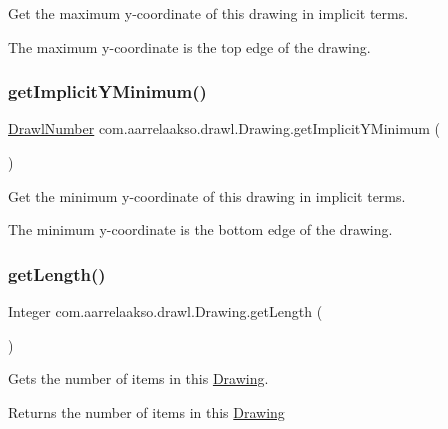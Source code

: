 Get the maximum y-\/coordinate of this drawing in implicit terms. 

The maximum y-\/coordinate is the top edge of the drawing. \mbox{\label{classcom_1_1aarrelaakso_1_1drawl_1_1_drawing_a0dcb410e8fb2769222b62d04da80eadd}} 
\subsubsection{\texorpdfstring{get\+Implicit\+Y\+Minimum()}{getImplicitYMinimum()}}
{\footnotesize\ttfamily \hyperlink{classcom_1_1aarrelaakso_1_1drawl_1_1_drawl_number}{Drawl\+Number} com.\+aarrelaakso.\+drawl.\+Drawing.\+get\+Implicit\+Y\+Minimum (\begin{DoxyParamCaption}{ }\end{DoxyParamCaption})\hspace{0.3cm}{\ttfamily [private]}}



Get the minimum y-\/coordinate of this drawing in implicit terms. 

The minimum y-\/coordinate is the bottom edge of the drawing. \mbox{\label{classcom_1_1aarrelaakso_1_1drawl_1_1_drawing_a5959904c0c6e0046703141bb2327ef90}} 
\subsubsection{\texorpdfstring{get\+Length()}{getLength()}}
{\footnotesize\ttfamily Integer com.\+aarrelaakso.\+drawl.\+Drawing.\+get\+Length (\begin{DoxyParamCaption}{ }\end{DoxyParamCaption})}



Gets the number of items in this \hyperlink{classcom_1_1aarrelaakso_1_1drawl_1_1_drawing}{Drawing}. 

\begin{DoxyReturn}{Returns}
the number of items in this \hyperlink{classcom_1_1aarrelaakso_1_1drawl_1_1_drawing}{Drawing} 
\end{DoxyReturn}
\mbox{\label{classcom_1_1aarrelaakso_1_1drawl_1_1_drawing_a7977c75a7448a5f93082e30753ce23c3}} 
